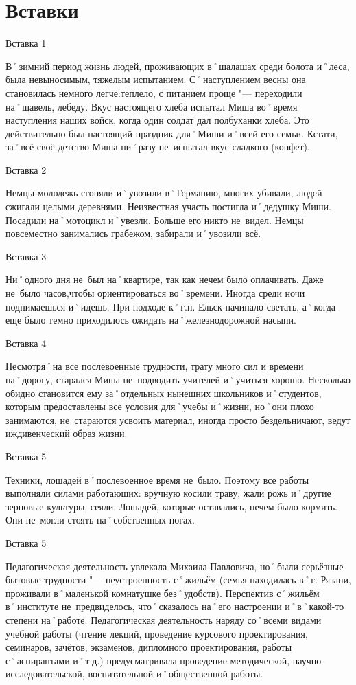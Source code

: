 ﻿\chapter{Вставки}


Вставка 1

В˚зимний период жизнь людей, проживающих в˚шалашах среди болота и˚леса, была невыносимым, тяжелым испытанием. С˚наступлением весны она становилась немного легче:теплело, с питанием проще "--- переходили на˚щавель, лебеду. Вкус настоящего хлеба испытал Миша во˚время наступления наших войск, когда один солдат дал полбуханки хлеба. Это действительно был настоящий праздник для˚Миши и˚всей его семьи. Кстати, за˚всё своё детство Миша ни˚разу не~испытал вкус сладкого (конфет).

Вставка 2

Немцы молодежь сгоняли и˚увозили в˚Германию, многих убивали, людей сжигали целыми деревнями. Неизвестная участь постигла и˚дедушку Миши. Посадили на˚мотоцикл и˚увезли. Больше его никто не~видел.
Немцы повсеместно занимались грабежом, забирали и˚увозили всё.

Вставка 3

Ни˚одного дня не~был на˚квартире, так как нечем было оплачивать. Даже не~было часов,чтобы ориентироваться во˚времени. Иногда среди ночи поднимаешься и˚идешь. При подходе к˚г.п. Ельск начинало светать, а˚когда еще было темно приходилось ожидать на˚железнодорожной насыпи.

Вставка 4

Несмотря˚на все послевоенные трудности, трату много сил и времени  на˚дорогу, старался Миша не~подводить учителей и˚учиться хорошо.
Несколько обидно становится ему за˚отдельных нынешних школьников и˚студентов, которым предоставлены все условия для˚учебы и˚жизни, но˚они плохо занимаются, не~стараются усвоить материал, иногда просто бездельничают, ведут иждивенческий образ жизни.

Вставка 5

Техники, лошадей в˚послевоенное время не~было. Поэтому все работы выполняли силами работающих: вручную косили траву, жали рожь и˚другие зерновые культуры, сеяли. Лошадей, которые оставались, нечем было кормить. Они не~могли стоять на˚собственных ногах.

Вставка 5

Педагогическая деятельность увлекала Михаила Павловича, но˚были серьёзные бытовые трудности "--- неустроенность с˚жильём (семья находилась в˚г. Рязани, проживали в˚маленькой комнатушке без˚удобств). Перспектив с˚жильём в˚институте не~предвиделось, что˚сказалось на˚его настроении и˚в˚какой-то степени на˚работе.
Педагогическая деятельность наряду со˚всеми видами учебной работы (чтение лекций, проведение курсового проектирования, семинаров, зачётов, экзаменов, дипломного проектирования, работы с˚аспирантами и˚т.д.) предусматривала проведение методической, научно-исследовательской, воспитательной и˚общественной работы.
 
